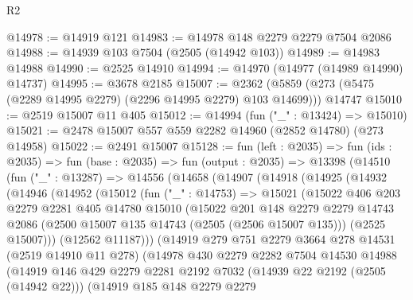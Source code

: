 \begin{lexlean}{R2}
\begin{coremodule}
@14978 := @14919 @121
@14983 := @14978 @148 @2279 @2279 @7504 @2086
@14988 := @14939 @103 @7504 (@2505 (@14942 @103))
@14989 := @14983 @14988
@14990 := @2525 @14910
@14994 := @14970 (@14977 (@14989 @14990) @14737)
@14995 := @3678 @2185
@15007 := @2362 (@5859 (@273 (@5475 (@2289 @14995 @2279) (@2296 @14995 @2279) @103 @14699))) @14747
@15010 := @2519 @15007 @11 @405
@15012 := @14994 (fun ("_" : @13424) => @15010)
@15021 := @2478 @15007 @557 @559 @2282 @14960 (@2852 @14780) (@273 @14958)
@15022 := @2491 @15007
@15128 := fun (left : @2035) =>
  fun (ids : @2035) =>
  fun (base : @2035) =>
  fun (output : @2035) =>
  @13398
    (@14510
      (fun ("_" : @13287) =>
      @14556
        (@14658
          (@14907
            (@14918
              (@14925
                (@14932
                  (@14946
                    (@14952
                      (@15012
                        (fun ("_" : @14753) =>
                        @15021
                          (@15022
                            @406
                            @203
                            @2279
                            @2281
                            @405
                            @14780
                            @15010
                            (@15022
                              @201
                              @148
                              @2279
                              @2279
                              @14743
                              @2086
                              (@2500 @15007 @135 @14743 (@2505 (@2506 @15007 @135)))
                              (@2525 @15007)))
                          (@12562 @11187)))
                      (@14919
                        @279
                        @751
                        @2279
                        @3664
                        @278
                        @14531
                        (@2519 @14910 @11 @278)
                        (@14978
                          @430
                          @2279
                          @2282
                          @7504
                          @14530
                          @14988
                          (@14919
                            @146
                            @429
                            @2279
                            @2281
                            @2192
                            @7032
                            (@14939 @22 @2192 (@2505 (@14942 @22)))
                            (@14919
                              @185
                              @148
                              @2279
                              @2279

\end{coremodule}
\end{lexlean}
